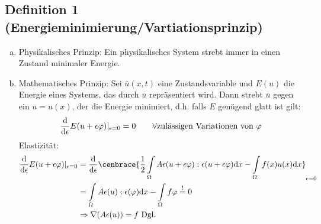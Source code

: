 \subsection{Definition 1 (Energieminimierung/Vartiationsprinzip)}
\label{sub:def_1}
\begin{enumerate}[(a)]
	\item Physikalisches Prinzip: Ein physikalisches System strebt immer in einen Zustand minimaler Energie.
	\item Mathematisches Prinzip: Sei $\bar{u}(x,t)$ eine Zustandsvariable und $E(u)$ die Energie eines Systems, das durch $\bar{u}$ repräsentiert wird.
	Dann strebt $\bar{u}$ gegen ein $u=u(x)$, der die Energie minimiert, d.h. falls $E$ genügend glatt ist gilt:
	\[
	\frac{\mathrm{d}  }{\mathrm{d} \epsilon} E(u+\epsilon\varphi)|_{\epsilon=0}=0\qquad \forall \text{zulässigen Variationen von }\varphi
	\]
	Elastizität:
	\begin{equation*}
	\begin{aligned}
		\difff{ }{\epsilon}E(u+\epsilon\varphi)|_{\epsilon=0} &= \difff{ }{\epsilon}\cenbrace{\frac{1}{2}\int\limits_{\Omega} A\epsilon(u+\epsilon\varphi):\epsilon(u+\epsilon\varphi)\dint x-\int\limits_{\Omega}f(x)u(x)\dint x}_{\epsilon=0}\\
		&=\int\limits_{\Omega}A\epsilon(u):\epsilon(\varphi)\dint x-\int\limits_{\Omega}f\varphi \bgl{!} 0\\
		&\Rightarrow \nabla(A\epsilon(u))=f \text{ Dgl.}
	\end{aligned}
	\end{equation*}
\end{enumerate}






























\cleardoubleoddemptypage
{}
\setcounter{page}{1}


\printindex
\listoffigures
